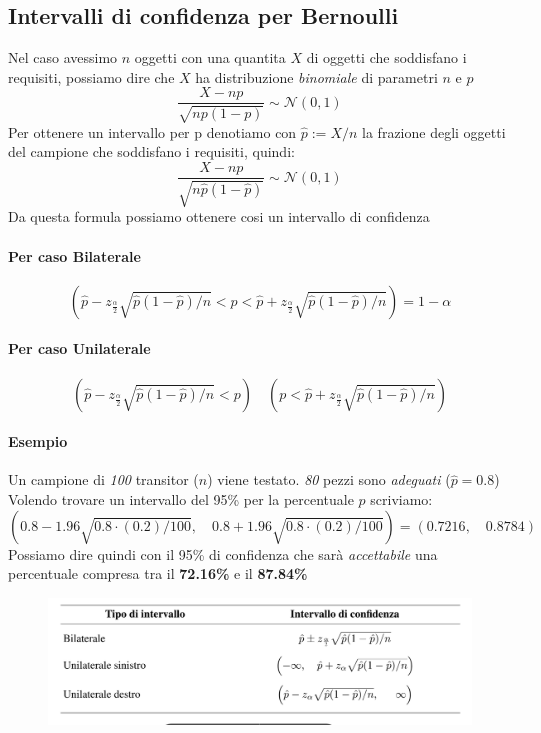 \documentclass[]{article}
\begin{document}
    \subsection{Intervalli di confidenza per Bernoulli}
    Nel caso avessimo $n$ oggetti con una quantita $X$ di oggetti che soddisfano i requisiti, possiamo dire che $X$ ha distribuzione \textit{binomiale} di parametri $n$ e $p$
    \[ \frac{X - np}{\sqrt{np(1-p)}} \sim \mathcal{N}(0,1) \]
    Per ottenere un intervallo per p denotiamo con $\hat{p} := X / n$ la frazione degli oggetti del campione che soddisfano i requisiti, quindi:
    \[ \frac{X - np}{\sqrt{n \hat{p}(1-\hat{p})}} \sim \mathcal{N}(0,1) \]
    Da questa formula possiamo ottenere cosi un intervallo di confidenza
    \paragraph{Per caso Bilaterale}
    \[ \left(\hat{p} - z_{\frac{\alpha}{2}} \sqrt{\hat{p} (1- \hat{p}) / n} < p < \hat{p} + z_{\frac{\alpha}{2}} \sqrt{\hat{p} (1- \hat{p}) / n} \right) = 1 - \alpha \]
    \paragraph{Per caso Unilaterale}
    \[  \left(\hat{p} - z_{\frac{\alpha}{2}} \sqrt{\hat{p} (1- \hat{p}) /n} < p \right) \quad \left(p < \hat{p} + z_{\frac{\alpha}{2}} \sqrt{\hat{p} (1-\hat{p}) / n} \right)\]
    \paragraph{Esempio} Un campione di \textit{100} transitor ($n$) viene testato. \textit{80} pezzi sono \textit{adeguati} ($\hat{p} = 0.8$)\\
    Volendo trovare un intervallo del 95\% per la percentuale $p$ scriviamo:
    \[ \left(0.8 - 1.96 \sqrt{0.8 \cdot (0.2) / 100}, \quad 0.8 + 1.96 \sqrt{0.8 \cdot (0.2) / 100} \right) = (0.7216, \quad 0.8784) \]
    Possiamo dire quindi con il 95\% di confidenza che sarà \textit{accettabile} una percentuale compresa tra il \textbf{72.16\%} e il \textbf{87.84\%}
    \begin{figure}[H]
        \includegraphics[width=\textwidth]{images/boh_3.png}
    \end{figure}
\end{document}
